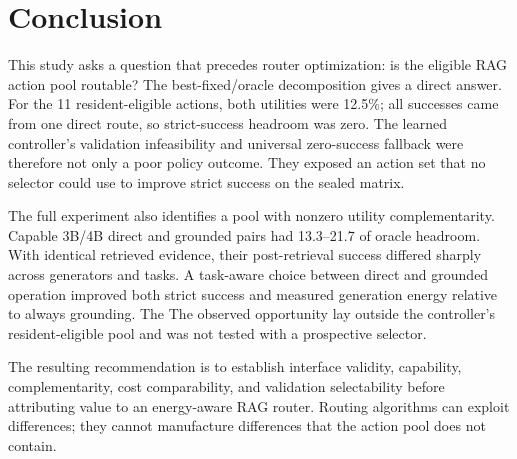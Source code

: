 \section{Conclusion}
\label{sec:conclusion}

This study asks a question that precedes router optimization: is the eligible RAG
action pool routable? The best-fixed/oracle decomposition gives a direct answer.
For the 11 resident-eligible actions, both utilities were 12.5\%; all successes came from
one direct route, so strict-success headroom was zero. The learned controller's
validation infeasibility and universal zero-success fallback were therefore not
only a poor policy outcome. They exposed an action set that no selector could use
to improve strict success on the sealed matrix.

The full experiment also identifies a pool with nonzero utility complementarity.
Capable 3B/4B direct and grounded pairs had 13.3--21.7 \pp{} of oracle headroom. With identical
retrieved evidence, their post-retrieval success differed sharply across generators
and tasks. A task-aware choice between direct and grounded operation improved both
strict success and measured generation energy relative to always grounding. The
The observed opportunity lay outside the controller's resident-eligible pool and
was not tested with a prospective selector.

The resulting recommendation is to establish interface validity, capability,
complementarity, cost comparability, and validation selectability before
attributing value to an energy-aware RAG router. Routing algorithms can exploit
differences; they cannot manufacture differences that the action pool does not
contain.
